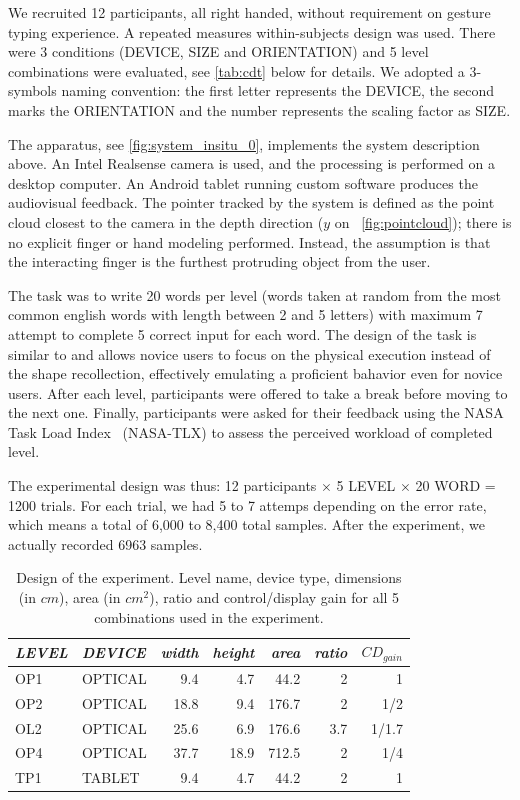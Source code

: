\documentclass{chi-ext}
\newcommand{\smit}[1]{{\small\textit{{#1}}}}
\newcommand{\cdt}[1]{{\small\uppercase{{#1}}}}
\begin{document}
We recruited 12 participants, all right handed, without requirement on gesture typing experience.
A repeated measures within-subjects design was used. There were 3 conditions (\cdt{device}, \cdt{size} and \cdt{orientation}) and 5 level combinations were evaluated, see \autoref{tab:cdt} below for details. We adopted a 3-symbols naming convention: the first letter represents the DEVICE, the second marks the ORIENTATION and the number represents the scaling factor as SIZE.

The apparatus, see \autoref{fig:system_insitu_0}, implements the system description above. An Intel Realsense camera is used, and the processing is performed on a desktop computer. An Android tablet running custom software produces the audiovisual feedback. The pointer tracked by the system is defined as the point cloud closest to the camera in the depth direction ($y$ on ~\autoref{fig:pointcloud}); there is no explicit finger or hand modeling performed. Instead, the assumption is that the interacting finger is the furthest protruding object from the user.

The task was to write 20 words per level (words taken at random from the most common english words with length between 2 and 5 letters) with maximum 7 attempt to complete 5 correct input for each word. The design of the task is similar to \cite{Quinn2016} and allows novice users to focus on the physical execution instead of the shape recollection, effectively emulating a proficient bahavior even for novice users. After each level, participants were offered to take a break before moving to the next one. Finally, participants were asked for their feedback using the NASA Task Load Index~\cite{Hart1988} (NASA-TLX) to assess the perceived workload of completed level.

The experimental design was thus: 12 participants $\times$ 5 \cdt{level} $\times$ 20 \cdt{word} = 1200 trials. For each trial, we had 5 to 7 attemps depending on the error rate, which means a total of 6,000 to 8,400 total samples. After the experiment, we actually recorded 6963 samples.

\begin{table}
  \centering
  \begin{tabular}{l l | r r r r r}
    \smit{LEVEL} & \smit{DEVICE} & \smit{width} & \smit{height} & \smit{area}& \smit{ratio} & \smit{$CD_{gain}$} \\
    \hline
    \cdt{OP1} & \cdt{optical} & 9.4 & 4.7 & 44.2 & 2 & 1 \\
    \cdt{OP2} & \cdt{optical} & 18.8 & 9.4 & 176.7 & 2 & 1/2 \\
    \cdt{OL2} & \cdt{optical} & 25.6 & 6.9 & 176.6 & 3.7 & 1/1.7 \\
    \cdt{OP4} & \cdt{optical} & 37.7 & 18.9 & 712.5 & 2 & 1/4 \\
    \hline
    \cdt{tp1} & \cdt{tablet} & 9.4 & 4.7 & 44.2 & 2 & 1 \\
  \end{tabular}
  \caption{Design of the experiment. Level name, device type, dimensions (in $cm$), area (in $cm^2$), ratio and control/display gain for all 5 combinations used in the experiment.}~\label{tab:cdt}
\end{table}
\end{document}
